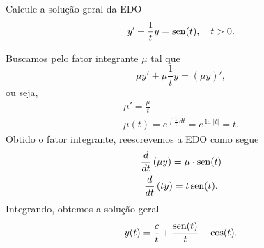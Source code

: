\begin{exeresol}
  Calcule a solução geral da EDO
  \begin{align}
    y' + \frac{1}{t}y = \operatorname{sen}(t),\quad t>0.
  \end{align}
\end{exeresol}
\begin{resol}
  Buscamos pelo fator integrante $\mu$ tal que
  \begin{equation}
    \mu y' + \mu \frac{1}{t}y = (\mu y)',
  \end{equation}
  ou seja,
  \begin{gather}
    \mu' = \frac{\mu}{t} \\
    \mu(t) = e^{\int \frac{1}{t}\,dt} = e^{\ln|t|} = t.
  \end{gather}
  Obtido o fator integrante, reescrevemos a EDO como segue
  \begin{gather}
    \frac{d}{dt}\left(\mu y\right) = \mu\cdot \operatorname{sen}(t) \\
    \frac{d}{dt}\left(t y\right) = t\operatorname{sen}(t).
  \end{gather}
  Integrando, obtemos a solução geral
  \begin{equation}
    y(t) = \frac{c}{t}  + \frac{\operatorname{sen}(t)}{t} - \cos(t).
  \end{equation}
\end{resol}

